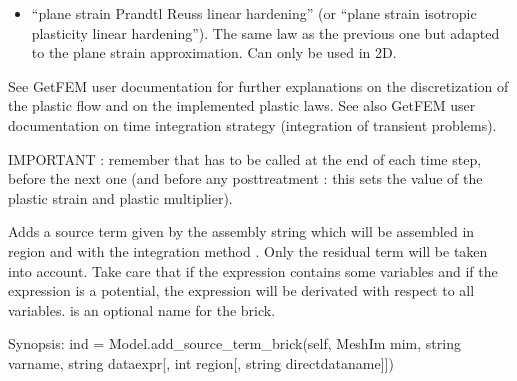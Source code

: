 \documentclass[a4paper,11pt,english]{sphinxmanual}
\begin{document}
\begin{fulllineitems}
\begin{fulllineitems}
\begin{itemize}
\item {} 
“plane strain Prandtl Reuss linear hardening”
(or “plane strain isotropic plasticity linear hardening”).
The same law as the previous one but adapted to the plane strain
approximation. Can only be used in 2D.

\end{itemize}

See GetFEM user documentation for further explanations on the
discretization of the plastic flow and on the implemented plastic laws.
See also GetFEM user documentation on time integration strategy
(integration of transient problems).

IMPORTANT : remember that  has
to be called at the end of each time step, before the next one
(and before any post\sphinxhyphen{}treatment : this sets the value of the plastic
strain and plastic multiplier).

\end{fulllineitems}


\begin{fulllineitems}
\label{\detokenize{python/cmdref_Model:getfem.Model.add_source_term}}
Adds a source term given by the assembly string  which will
be assembled in region  and with the integration method .
Only the residual term will be taken into account.
Take care that if the expression contains some variables and if the
expression is a potential, the expression will be
derivated with respect to all variables.
 is an optional name for the brick.

\end{fulllineitems}


\begin{fulllineitems}
\label{\detokenize{python/cmdref_Model:getfem.Model.add_source_term_brick}}
Synopsis: ind = Model.add\_source\_term\_brick(self, MeshIm mim, string varname, string dataexpr{[}, int region{[}, string directdataname{]}{]})


\end{fulllineitems}
\end{fulllineitems}
\end{document}
